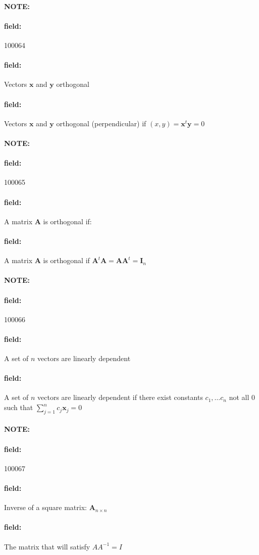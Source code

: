 \documentclass[12pt]{article}
\newenvironment{note}{\paragraph{NOTE:}}{}
\newenvironment{field}{\paragraph{field:}}{}
\begin{document}


\begin{note} \begin{field} \tiny 100064 \end{field}
 \begin{field}
  Vectors $\mathbf{x}$ and $\mathbf{y}$ orthogonal
 \end{field}
 \begin{field}
  Vectors $\mathbf{x}$ and $\mathbf{y}$ orthogonal (perpendicular) if $(x,y) = \mathbf{x}^t \mathbf{y} = 0$
 \end{field}
\end{note}

\begin{note} \begin{field} \tiny 100065 \end{field}
 \begin{field}
  A matrix $\mathbf{A}$ is orthogonal if:
 \end{field}
 \begin{field}
  A matrix $\mathbf{A}$ is orthogonal if $\mathbf{A}^t \mathbf{A} = \mathbf{A} \mathbf{A}^t = \mathbf{I}_n$
 \end{field}
\end{note}

\begin{note} \begin{field} \tiny 100066 \end{field}
 \begin{field}
  A set of $n$ vectors are linearly dependent
 \end{field}
 \begin{field}
  A set of $n$ vectors are linearly dependent if there exist constants $c_1, \ldots c_n$ not all 0 such that $\sum_{j=1}^n c_j \mathbf{x}_j = 0$
 \end{field}
\end{note}

\begin{note} \begin{field} \tiny 100067 \end{field}
 \begin{field}
  Inverse of a square matrix: $\mathbf{A}_{n\times n}$
 \end{field}
 \begin{field}
  The matrix that will satisfy $AA^{-1} = I$
 \end{field}
\end{note}
\end{document}
